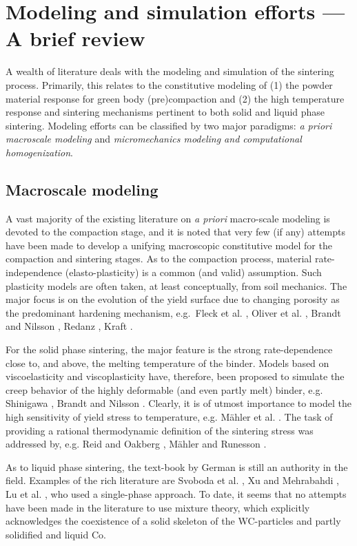 \documentclass[ExampleMasters.tex]{subfiles}
\begin{document}
\section{Modeling and simulation efforts --- A brief review}

A wealth of literature deals with the modeling and simulation of the sintering process.
Primarily, this relates to the constitutive modeling of
(1) the powder material response for green body (pre)compaction and 
(2) the high temperature response and sintering mechanisms pertinent to both solid and liquid phase sintering.
Modeling efforts can be classified by two major paradigms: \emph{a priori macroscale modeling} and \emph{micromechanics modeling and computational homogenization}.

\subsection{Macroscale modeling}

A vast majority of the existing literature on \emph{a priori} macro-scale modeling is devoted to the compaction stage, and it is noted that very few (if any) attempts have been made to develop a unifying macroscopic constitutive model for the compaction and sintering stages.
As to the compaction process, material rate-independence (elasto-plasticity) is a common (and valid) assumption.
Such plasticity models are often taken, at least conceptually, from soil mechanics.
The major focus is on the evolution of the yield surface due to changing porosity as the predominant hardening mechanism, e.g.\ Fleck et al. \cite{FleKuhMcM1992},
Oliver et al. \cite{OliOllCan1996}, Brandt and Nilsson \cite{BraNil1998}, Redanz \cite{Red1998}, Kraft \cite{Kra2003}.

For the solid phase sintering, the major feature is the strong rate-dependence close to, and above, the melting temperature of the binder.
Models based on viscoelasticity and viscoplasticity have, therefore, been proposed to simulate the creep behavior of the highly deformable (and even partly melt) binder, e.g. Shinigawa \cite{Shi1996}, Brandt and Nilsson \cite{BraNil1998}.
Clearly, it is of utmost importance to model the high sensitivity of yield stress to temperature, e.g. Mähler et al. \cite{MahEkhRun2001a}.
The task of providing a rational thermodynamic definition of the sintering stress was addressed by, e.g. Reid and Oakberg \cite{ReiOak1990}, Mähler and Runesson \cite{MahRun2000}.

As to liquid phase sintering, the text-book by German \cite{Ger1985} is still an authority in the field.
Examples of the rich literature are Svoboda et al. \cite{SvoRieGae1996}, Xu and Mehrabahdi \cite{XuMeh1997}, Lu et al. \cite{LuXuYiGer2001}, who used a single-phase approach.
To date, it seems that no attempts have been made in the literature to use mixture theory, which explicitly acknowledges the coexistence of a solid skeleton of the WC-particles and partly solidified and liquid Co.
\end{document}
